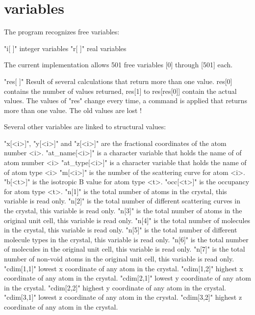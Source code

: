 \section{variables}
The program recognizes free variables: 
\par
\begin{MacVerbatim}
"i[ ]"  integer variables
"r[ ]"  real variables
\end{MacVerbatim}
The current implementation allows 501 free variables [0] through [501] each. 
\par
\begin{MacVerbatim}
"res[ ]"  Result of several calculations that return more than one
          value.
          res[0] contains the number of values returned, res[1] to
          res[res[0]] contain the actual values.
          The values of "res" change every time, a command is applied
          that returns more than one value. The old values are lost !
\end{MacVerbatim}
Several other variables are linked to structural values: 
\par
\begin{MacVerbatim}
"x[<i>]",
"y[<i>]" and
"z[<i>]" are the fractional coordinates of the atom number <i>.
"at_name[<i>]" is a character variable that holds the name of
         of atom number <i>
"at_type[<i>]" is a character variable that holds the name of
         of atom type <i>
"m[<i>]" is the number of the scattering curve for atom <i>.
"b[<t>]" is the isotropic B value for atom type <t>.
"occ[<t>]" is the occupancy for atom type <t>.
"n[1]"   is the total number of atoms in the crystal, this variable
         is read only.
"n[2]"   is the total number of different scattering curves in the
         crystal, this variable is read only.
"n[3]"   is the total number of atoms in the original unit cell,
         this variable is read only.
"n[4]"   is the total number of molecules in the crystal, this variable
         is read only.
"n[5]"   is the total number of different molecule types in the
         crystal, this variable is read only.
"n[6]"   is the total number of molecules in the original unit cell,
         this variable is read only.
"n[7]"   is the total number of non-void atoms in the original unit cell,
         this variable is read only.
"cdim[1,1]" lowest  x coordinate of any atom in the crystal.
"cdim[1,2]" highest x coordinate of any atom in the crystal.
"cdim[2,1]" lowest  y coordinate of any atom in the crystal.
"cdim[2,2]" highest y coordinate of any atom in the crystal.
"cdim[3,1]" lowest  z coordinate of any atom in the crystal.
"cdim[3,2]" highest z coordinate of any atom in the crystal.
\end{MacVerbatim}
